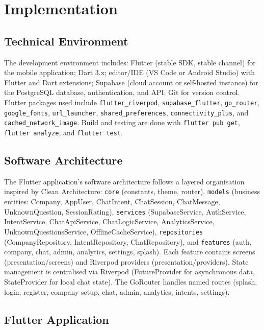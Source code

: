 \documentclass[12pt,a4paper]{report}
\begin{document}
\chapter{Implementation}

\section{Technical Environment}

The development environment includes: Flutter (stable SDK, stable channel) for the mobile application; Dart 3.x; editor/IDE (VS Code or Android Studio) with Flutter and Dart extensions; Supabase (cloud account or self-hosted instance) for the PostgreSQL database, authentication, and API; Git for version control. Flutter packages used include \texttt{flutter\_riverpod}, \texttt{supabase\_flutter}, \texttt{go\_router}, \texttt{google\_fonts}, \texttt{url\_launcher}, \texttt{shared\_preferences}, \texttt{connectivity\_plus}, and \texttt{cached\_network\_image}. Build and testing are done with \texttt{flutter pub get}, \texttt{flutter analyze}, and \texttt{flutter test}.

\section{Software Architecture}

The Flutter application's software architecture follows a layered organisation inspired by Clean Architecture: \texttt{core} (constants, theme, router), \texttt{models} (business entities: Company, AppUser, ChatIntent, ChatSession, ChatMessage, UnknownQuestion, SessionRating), \texttt{services} (SupabaseService, AuthService, IntentService, ChatApiService, ChatLogicService, AnalyticsService, UnknownQuestionsService, OfflineCacheService), \texttt{repositories} (CompanyRepository, IntentRepository, ChatRepository), and \texttt{features} (auth, company, chat, admin, analytics, settings, splash). Each feature contains screens (presentation/screens) and Riverpod providers (presentation/providers). State management is centralised via Riverpod (FutureProvider for asynchronous data, StateProvider for local chat state). The GoRouter handles named routes (splash, login, register, company-setup, chat, admin, analytics, intents, settings).

\section{Flutter Application}
\end{document}
